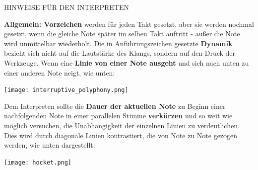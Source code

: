 \documentclass[12pt]{article}
\newcommand*\circled[1]{\tikz[baseline=(char.base)]{
            \node[shape=circle,draw,inner sep=1pt] (char) {#1};}}
\begin{document}
\begingroup
\begin{center}
\huge HINWEISE FÜR DEN INTERPRETEN
\end{center}
\endgroup

\begingroup
\textbf{Allgemein: \circled{1} Vorzeichen} werden für jeden Takt gesetzt, aber sie werden nochmal gesetzt, wenn die gleiche Note später im selben Takt auftritt - außer die Note wird unmittelbar wiederholt. \textbf{\circled{2}} Die in Anführungszeichen gesetzte \textbf{Dynamik} bezieht sich nicht auf die Lautstärke des Klangs, sondern auf den Druck der Werkzeuge. \textbf{\circled{3}} Wenn eine \textbf{Linie von einer Note ausgeht} und sich nach unten zu einer anderen Note neigt, wie unten: 

\begin{center}
\texttt{[image: interruptive\_polyphony.png]}
\end{center}

Dem Interpreten sollte die \textbf{Dauer der aktuellen Note} zu Beginn einer nachfolgenden Note in einer parallelen Stimme \textbf{verkürzen} und so weit wie möglich versuchen, die Unabhängigkeit der einzelnen Linien zu verdeutlichen. Dies wird durch diagonale Linien kontrastiert, die von Note zu Note gezogen werden, wie unten dargestellt: 

\begin{center}
\texttt{[image: hocket.png]}
\end{center}
\end{document}

